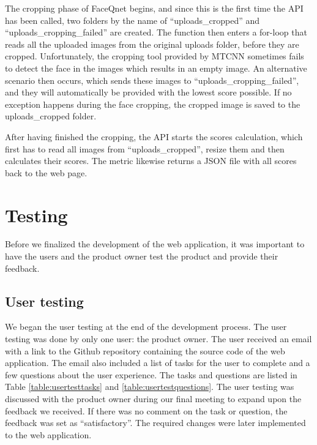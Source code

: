 The cropping phase of FaceQnet begins, and since this is the first time the API has been called, two folders by the name of ``uploads\_cropped'' and ``uploads\_cropping\_failed'' are created. The function then enters a for-loop that reads all the uploaded images from the original uploads folder, before they are cropped. Unfortunately, the cropping tool provided by MTCNN sometimes fails to detect the face in the images which results in an empty image. An alternative scenario then occurs, which sends these images to ``uploads\_cropping\_failed'', and they will automatically be provided with the lowest score possible. If no exception happens during the face cropping, the cropped image is saved to the uploads\_cropped folder.  

After having finished the cropping, the API starts the scores calculation, which first has to read all images from ``uploads\_cropped'', resize them and then calculates their scores. The metric likewise returns a JSON file with all scores back to the web page. 

\section{Testing}
Before we finalized the development of the web application, it was important to have the users and the product owner test the product and provide their feedback. 

\subsection{User testing}
We began the user testing at the end of the development process. The user testing was done by only one user: the product owner. The user received an email with a link to the Github repository containing the source code of the web application. The email also included a list of tasks for the user to complete and a few questions about the user experience. The tasks and questions are listed in Table \ref{table:usertesttasks} and \ref{table:usertestquestions}. The user testing was discussed with the product owner during our final meeting to expand upon the feedback we received. If there was no comment on the task or question, the feedback was set as ``satisfactory''. The required changes were later implemented to the web application.

\newpage

